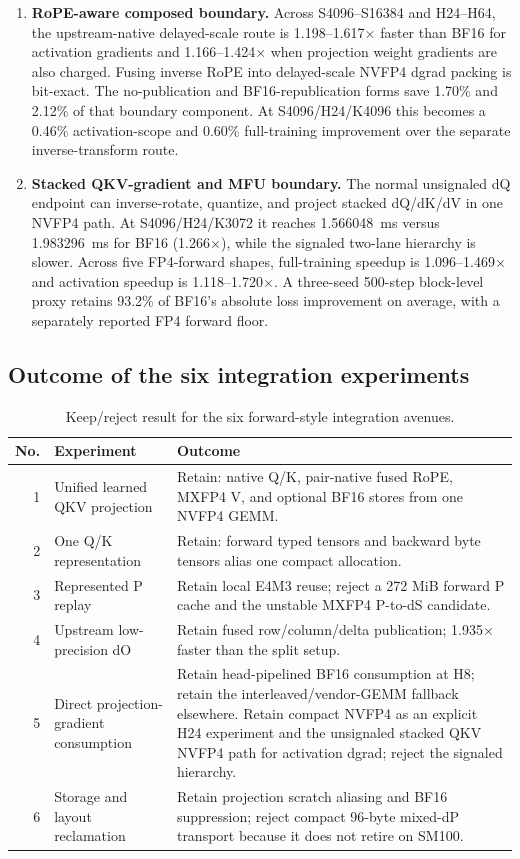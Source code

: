 \begin{enumerate}
  \item \textbf{RoPE-aware composed boundary.}  Across S4096--S16384 and
  H24--H64, the upstream-native delayed-scale route is
  1.198--1.617$\times$ faster than BF16 for activation gradients and
  1.166--1.424$\times$ when projection weight gradients are also charged.
  Fusing inverse RoPE into delayed-scale NVFP4 dgrad packing is bit-exact.
  The no-publication and BF16-republication forms save 1.70\% and 2.12\% of
  that boundary component.  At S4096/H24/K4096 this becomes a 0.46\%
  activation-scope and 0.60\% full-training improvement over the separate
  inverse-transform route.
  \item \textbf{Stacked QKV-gradient and MFU boundary.}  The normal unsignaled
  dQ endpoint can inverse-rotate, quantize, and project stacked dQ/dK/dV in one
  NVFP4 path.  At S4096/H24/K3072 it reaches 1.566048~ms versus 1.983296~ms
  for BF16 (1.266$\times$), while the signaled two-lane hierarchy is slower.
  Across five FP4-forward shapes, full-training speedup is
  1.096--1.469$\times$ and activation speedup is 1.118--1.720$\times$.
  A three-seed 500-step block-level proxy retains 93.2\% of BF16's absolute
  loss improvement on average, with a separately reported FP4 forward floor.
\end{enumerate}

\subsection{Outcome of the six integration experiments}

\begin{table}[htbp]
\centering
\caption{Keep/reject result for the six forward-style integration avenues.}
\label{tab:six-integration-outcomes}
\small
\begin{tabularx}{\textwidth}{r p{} X}
\toprule
No. & Experiment & Outcome \\
\midrule
1 & Unified learned QKV projection & Retain: native Q/K, pair-native fused RoPE, MXFP4 V, and optional BF16 stores from one NVFP4 GEMM. \\
2 & One Q/K representation & Retain: forward typed tensors and backward byte tensors alias one compact allocation. \\
3 & Represented P replay & Retain local E4M3 reuse; reject a 272 MiB forward P cache and the unstable MXFP4 P-to-dS candidate. \\
4 & Upstream low-precision dO & Retain fused row/column/delta publication; 1.935$\times$ faster than the split setup. \\
5 & Direct projection-gradient consumption & Retain head-pipelined BF16 consumption at H8; retain the interleaved/vendor-GEMM fallback elsewhere.  Retain compact NVFP4 as an explicit H24 experiment and the unsignaled stacked QKV NVFP4 path for activation dgrad; reject the signaled hierarchy. \\
6 & Storage and layout reclamation & Retain projection scratch aliasing and BF16 suppression; reject compact 96-byte mixed-dP transport because it does not retire on SM100. \\
\bottomrule
\end{tabularx}
\end{table}

